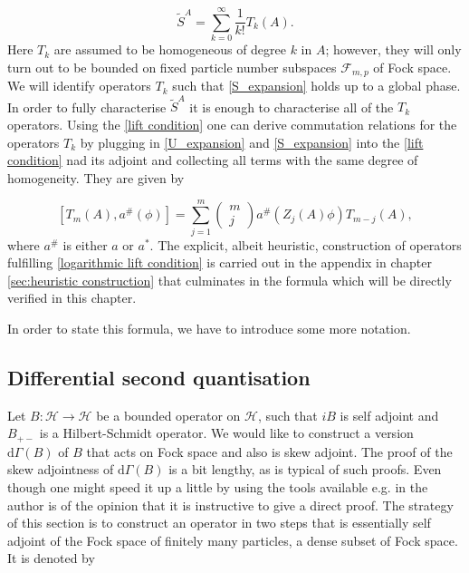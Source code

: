 \documentclass[b5paper,draft,openbib,12pt]{memoir}
\begin{document}
\begin{equation}\label{S_expansion}
\tilde{S}^A=\sum_{k=0}^\infty \frac{1}{k!} T_k(A).
\end{equation}
Here \(T_k\) are assumed to be homogeneous of degree 
\(k\) in \(A\); however, they will only turn out to be 
bounded on
fixed particle number subspaces \(\mathcal{F}_{m,p}\) of 
Fock space. We will identify operators \(T_k\) such that 
\eqref{S_expansion}
holds up to a global phase. 
In order to fully characterise \(\tilde{S}^A\) it is enough 
to characterise all of the \(T_k\) operators. 
Using the \eqref{lift condition} one can derive commutation 
relations for the operators 
\(T_k\) by plugging in \eqref{U_expansion} and 
\eqref{S_expansion} into the \eqref{lift condition} nad its 
adjoint
and collecting all terms with the same degree of homogeneity. 
They are given by

\begin{equation}\label{logarithmic lift condition}
\left[T_m(A) , a^\# (\phi)\right]= \sum_{j=1}^{m} \begin{pmatrix} m \\ j \end{pmatrix} a^\# \left(Z_j (A) \phi \right) T_{m-j}(A), 
\end{equation}
where \(a^\#\) is either \(a\) or \(a^*\). The 
explicit, albeit heuristic, construction 
of operators fulfilling \eqref{logarithmic lift condition}
is carried out in the appendix in chapter 
\ref{sec:heuristic construction} that culminates in 
the formula which will be directly verified in 
this chapter.

In order to state this formula, we have to introduce 
some more notation.

\subsection{Differential second quantisation}

Let \(B:\mathcal{H}\rightarrow\mathcal{H}\) be a bounded
operator on \(\mathcal{H}\), such that \(i B\) is self 
adjoint and \(B_{+-}\) is a Hilbert-Schmidt operator. 
We would like to construct a version \(\mathrm{d}\Gamma(B)\) 
of \(B\) that acts on Fock space and also is skew adjoint.
The proof of the skew adjointness of 
\(\mathrm{d}\Gamma(B)\) is a bit lengthy, as is typical 
of such proofs. Even though one might speed it 
up a little by using the tools available e.g. in 
\cite{derezinski2013mathematics} the author is of the 
opinion that it is instructive to give a direct proof.
The strategy of this section is to construct an operator in 
two steps that is essentially self adjoint of the Fock space 
of 
finitely many particles, a dense subset of Fock space. It is 
denoted by
\end{document}
